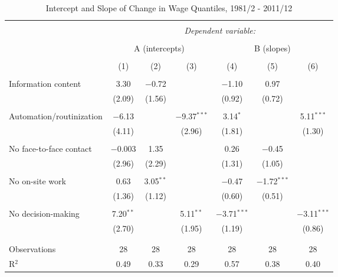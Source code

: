 

\begin{sidewaystable}[!htbp] \centering 
  \caption{Intercept and Slope of Change in Wage Quantiles, 1981/2 - 2011/12} 
  \label{tab:quantreg1} 
\begin{tabular}{@{\extracolsep{0pt}}lcccccc} 
\\[-1.8ex]\hline 
\hline \\[-1.8ex] 
 & \multicolumn{6}{c}{\textit{Dependent variable:}} \\ 
\cline{2-7} 
\\[-1.8ex] & \multicolumn{3}{c}{A (intercepts)} & \multicolumn{3}{c}{B (slopes)} \\ 
\\[-1.8ex] & (1) & (2) & (3) & (4) & (5) & (6)\\ 
\hline \\[-1.8ex] 
 Information content & 3.30 & $-$0.72 &  & $-$1.10 & 0.97 &  \\ 
  & (2.09) & (1.56) &  & (0.92) & (0.72) &  \\ 
  & & & & & & \\ 
 Automation/routinization & $-$6.13 &  & $-$9.37$^{***}$ & 3.14$^{*}$ &  & 5.11$^{***}$ \\ 
  & (4.11) &  & (2.96) & (1.81) &  & (1.30) \\ 
  & & & & & & \\ 
 No face-to-face contact & $-$0.003 & 1.35 &  & 0.26 & $-$0.45 &  \\ 
  & (2.96) & (2.29) &  & (1.31) & (1.05) &  \\ 
  & & & & & & \\ 
 No on-site work & 0.63 & 3.05$^{**}$ &  & $-$0.47 & $-$1.72$^{***}$ &  \\ 
  & (1.36) & (1.12) &  & (0.60) & (0.51) &  \\ 
  & & & & & & \\ 
 No decision-making & 7.20$^{**}$ &  & 5.11$^{**}$ & $-$3.71$^{***}$ &  & $-$3.11$^{***}$ \\ 
  & (2.70) &  & (1.95) & (1.19) &  & (0.86) \\ 
  & & & & & & \\ 
\hline \\[-1.8ex] 
Observations & 28 & 28 & 28 & 28 & 28 & 28 \\ 
R$^{2}$ & 0.49 & 0.33 & 0.29 & 0.57 & 0.38 & 0.40 \\ 

\end{tabular}
\end{sidewaystable}
